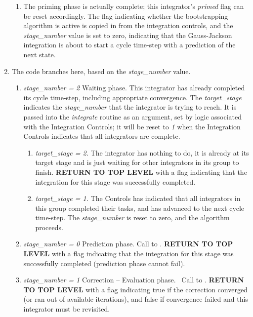 \begin{enumerate}
\begin{enumerate}
\item \label{ref:step3_4} The priming phase is actually complete; this
integrator's \textit{primed} flag can be reset
accordingly. The flag indicating whether the bootstrapping algorithm is
active is copied in from the integration controls, and the
\textit{stage\_number} value is set to zero, indicating that the Gauss-Jackson
integration is about to start a cycle time-step with a prediction of
the next state.
\end{enumerate}


\item \label{ref:step4} The code branches here, based on the \textit{stage\_number} value.

\begin{enumerate}
\item \textit{stage\_number = 2} Waiting phase. This integrator has
already completed its cycle time-step, including appropriate
convergence. The \textit{target\_stage }indicates the
\textit{stage\_number} that the integrator is trying to reach. It is
passed into the \textit{integrate} routine as an argument, set by logic
associated with the Integration Controls; it will be reset to \textit{1}
when the Integration Controls indicates that all integrators are
complete.

\begin{enumerate}
\item \textit{target\_stage = 2. }The integrator has nothing to do, it
is already at its target stage and is just waiting for other
integrators in its group to finish. \textbf{RETURN TO TOP LEVEL} with
a flag indicating that the integration for this stage was successfully
completed.
\item \textit{target\_stage = 1. }The Controls has indicated
that all integrators in this group completed their tasks, and has
advanced to the next cycle time-step. The \textit{stage\_number} is reset to
zero, and the algorithm proceeds.
\end{enumerate}

\item \textit{stage\_number = 0} Prediction phase. Call to
.
\textbf{RETURN TO TOP LEVEL }with a flag
indicating that the integration for this stage was successfully
completed (prediction phase cannot fail).

\item \textit{stage\_number = 1} Correction -- Evaluation phase.
\ Call to .
\textbf{RETURN TO TOP LEVEL} with a flag indicating true if the
correction converged (or ran out of
available iterations), and false if convergence failed and this
integrator must be revisited.
\end{enumerate}
\end{enumerate}


